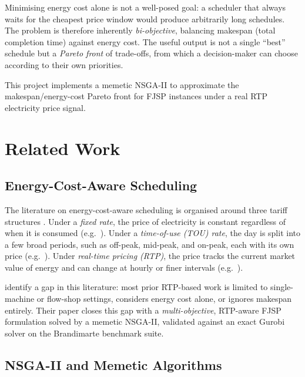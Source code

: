 \documentclass[11pt,a4paper]{article}
\begin{document}
Minimising energy cost alone is not a well-posed goal: a scheduler that always waits for the cheapest
price window would produce arbitrarily long schedules. The problem is therefore inherently
\emph{bi-objective}, balancing makespan (total completion time) against energy cost. The useful output
is not a single ``best'' schedule but a \emph{Pareto front} of trade-offs, from which a decision-maker
can choose according to their own priorities.

This project implements a memetic NSGA-II to approximate the makespan/energy-cost Pareto front for
FJSP instances under a real RTP electricity price signal.

\section{Related Work}
\label{sec:related-work}

\subsection{Energy-Cost-Aware Scheduling}
\label{subsec:energy-cost-aware}

The literature on energy-cost-aware scheduling is organised around three tariff structures
\citep{burmeister2024memetic}. Under a \emph{fixed rate}, the price of electricity is constant
regardless of when it is consumed (e.g.\ \citet{carlucci2021job,kemmo2015job}). Under a
\emph{time-of-use (TOU) rate}, the day is split into a few broad periods, such as off-peak,
mid-peak, and on-peak, each with its own price (e.g.\ \citet{zhang2014energy,biel2018flow}). Under
\emph{real-time pricing (RTP)}, the price tracks the current market value of energy and can change
at hourly or finer intervals (e.g.\ \citet{gong2015energy,shrouf2014optimizing}).

\citet{burmeister2024memetic} identify a gap in this literature: most prior RTP-based work is limited
to single-machine or flow-shop settings, considers energy cost alone, or ignores makespan entirely.
Their paper closes this gap with a \emph{multi-objective}, RTP-aware FJSP formulation solved by a
memetic NSGA-II, validated against an exact Gurobi solver on the Brandimarte
\citep{brandimarte1993routing} benchmark suite.

\subsection{NSGA-II and Memetic Algorithms}
\label{subsec:nsga2-memetic}
\end{document}

